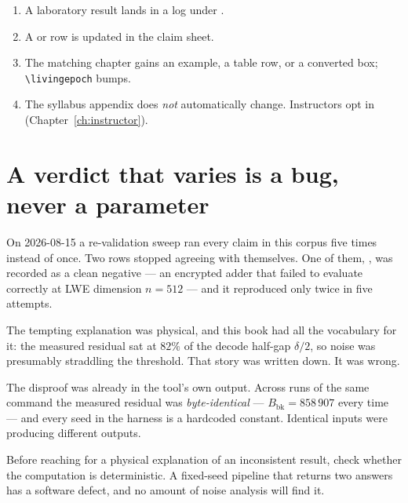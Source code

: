 \begin{enumerate}
  \item A laboratory result lands in a log under .
  \item A  or  row is updated in the claim sheet.
  \item The matching chapter gains an example, a table row, or a converted
        box; \texttt{\textbackslash livingepoch} bumps.
  \item The syllabus appendix does \emph{not} automatically change.
        Instructors opt in (Chapter~\ref{ch:instructor}).
\end{enumerate}


\section{A verdict that varies is a bug, never a parameter}
\label{sec:determinism}

On 2026-08-15 a re-validation sweep ran every claim in this corpus five times
instead of once. Two rows stopped agreeing with themselves. One of them,
, was recorded as a clean negative --- an encrypted adder that failed to
evaluate correctly at LWE dimension $n{=}512$ --- and it reproduced only twice in
five attempts.

The tempting explanation was physical, and this book had all the vocabulary for
it: the measured residual sat at $82\%$ of the decode half-gap $\delta/2$, so
noise was presumably straddling the threshold. That story was written down. It
was wrong.

The disproof was already in the tool's own output. Across runs of the same
command the measured residual was \emph{byte-identical} --- $B_{\mathrm{bk}} =
858\,907$ every time --- and every seed in the harness is a hardcoded constant.
Identical inputs were producing different outputs.

\begin{warning}
Before reaching for a physical explanation of an inconsistent result, check
whether the computation is deterministic. A fixed-seed pipeline that returns two
answers has a software defect, and no amount of noise analysis will find it.
\end{warning}

